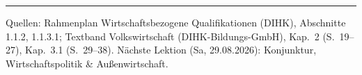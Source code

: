 \documentclass[11pt, a4paper]{article}
\begin{document}
\vspace{1em}
\hrule
\vspace{0.8em}
\noindent\textsf{\small Quellen: Rahmenplan Wirtschaftsbezogene Qualifikationen (DIHK), Abschnitte 1.1.2, 1.1.3.1;
Textband Volkswirtschaft (DIHK-Bildungs-GmbH), Kap.~2 (S.~19--27), Kap.~3.1 (S.~29--38).
Nächste Lektion (Sa, 29.08.2026): Konjunktur, Wirtschaftspolitik \& Außenwirtschaft.}
\end{document}
